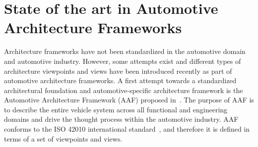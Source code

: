 \section{State of the art in Automotive Architecture Frameworks}\label{sec:automotiveAF}
Architecture frameworks have not been standardized in the automotive domain and automotive industry. 
However, some attempts exist and different types of architecture viewpoints and views have been introduced recently as part
of automotive architecture frameworks. 
A first attempt towards a standardized architectural foundation and automotive-specific
architecture framework is the Automotive
Architecture Framework (AAF) proposed in~\cite{Broy}. 
The purpose of AAF is to describe the entire vehicle system
across all functional and engineering domains and drive the thought process within the
automotive industry.
 AAF conforms to the ISO 42010 international standard~\cite{42010}, and therefore it is defined in terms of a set of viewpoints and views. 
%
%
%
%
%
